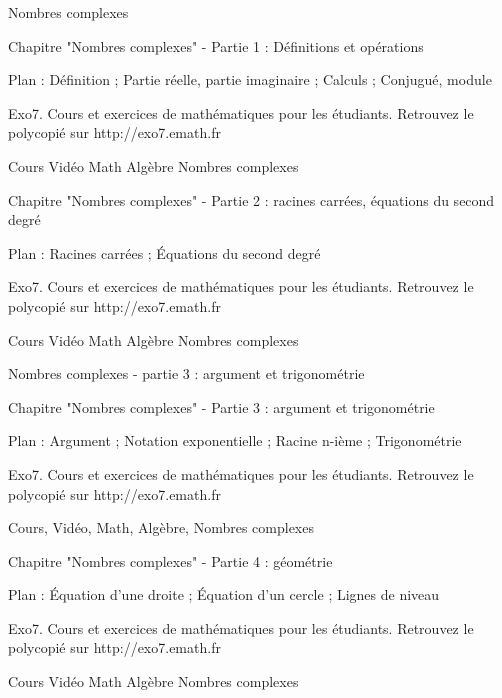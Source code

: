 
   Nombres complexes




Chapitre "Nombres complexes" - Partie 1 : Définitions et opérations

Plan : Définition ; Partie réelle, partie imaginaire ; Calculs ; Conjugué, module

Exo7. Cours et exercices de mathématiques pour les étudiants.
Retrouvez le polycopié sur http://exo7.emath.fr


Cours Vidéo Math Algèbre Nombres complexes 





Chapitre "Nombres complexes" - Partie 2 : racines carrées, équations du second degré

Plan : Racines carrées ; Équations du second degré

Exo7. Cours et exercices de mathématiques pour les étudiants.
Retrouvez le polycopié sur http://exo7.emath.fr


Cours Vidéo Math Algèbre Nombres complexes 



Nombres complexes - partie 3 : argument et trigonométrie


Chapitre "Nombres complexes" - Partie 3 : argument et trigonométrie

Plan : Argument ; Notation exponentielle ; Racine n-ième ; Trigonométrie

Exo7. Cours et exercices de mathématiques pour les étudiants.
Retrouvez le polycopié sur http://exo7.emath.fr


Cours, Vidéo, Math, Algèbre, Nombres complexes 




Chapitre "Nombres complexes" - Partie 4 : géométrie

Plan : Équation d'une droite ; Équation d'un cercle ; Lignes de niveau

Exo7. Cours et exercices de mathématiques pour les étudiants.
Retrouvez le polycopié sur http://exo7.emath.fr


Cours Vidéo Math Algèbre Nombres complexes 
